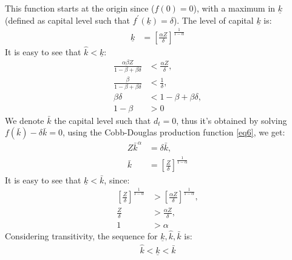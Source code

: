 \documentclass[12pt]{report}
\begin{document}
This function starts at the origin since (\(f(0)=0\)), with a maximum in \(\underline{k}\) (defined as capital level
such that \(f^{\prime}(\underline{k})=\delta\)). The level of capital \(\underline{k}\) is:
\begin{align}
    \underline{k} &= \left[\frac{\alpha Z}{\delta}\right]^{\frac{1}{1-\alpha}}  \label{eq19}
\end{align}
It is easy to see that \(\hat{k}<\underline{k}\):
\begin{align*}
    \frac{\alpha \beta Z}{1-\beta+\beta \delta}&<\frac{\alpha Z}{\delta},\\
    \frac{\beta}{1-\beta+\beta \delta}&<\frac{1}{\delta},\\
    \beta \delta &<1-\beta + \beta \delta, \\
    1-\beta&>0 
\end{align*}
We denote \(\bar{k}\) the capital level such that \(d_t=0\), thus it's obtained by solving \(f(\bar{k}) -\delta
\bar{k} = 0\), using the Cobb-Douglas production function \ref{eq6}, we get:
\begin{align}
    Z \bar{k}^{\alpha} &= \delta \bar{k}, \nonumber\\
    \bar{k}&=\left[\frac{Z}{\delta}\right]^{\frac{1}{1-\alpha}}
\end{align}
It is easy to see that \(\underline{k}<\bar{k}\), since:
\begin{align}
    \left[\frac{Z}{\delta}\right]^{\frac{1}{1-\alpha}}&>\left[\frac{\alpha Z}{\delta}\right]^{\frac{1}{1-\alpha}},\nonumber\\
    \frac{Z}{\delta}&>\frac{\alpha Z}{\delta}, \nonumber \\
    1&>\alpha \nonumber 
\end{align}
Considering transitivity, the sequence for \(\underline{k}, \hat{k}, \bar{k}\) is:
\begin{align*}
    \hat{k} < \underline{k} < \bar{k}
\end{align*}
\end{document}
